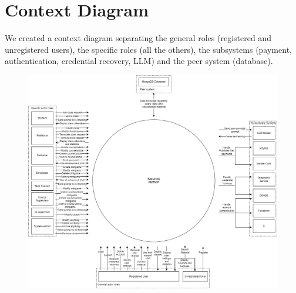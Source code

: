 \section{Context Diagram} \label{context-diagram}
We created a context diagram separating the general roles (registered and unregistered users), the specific roles (all the others), the subsystems (payment, authentication, credential recovery, LLM) and the peer system (database).

\begin{figure}[h]
	\centering
	\includegraphics[width=1.0\textwidth]{images/ContextDiagram.png}
\end{figure}